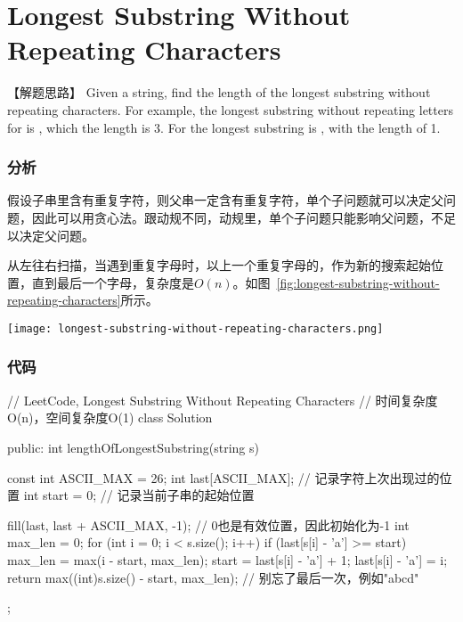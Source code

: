 \section{Longest Substring Without Repeating Characters} %
\label{sec:longest-substring-without-repeating-characters}


【解题思路】
Given a string, find the length of the longest substring without repeating characters. For example, the longest substring without repeating letters for  is 
, which the length is 3. For  the longest substring is , with the length of 1.


\subsubsection{分析}
假设子串里含有重复字符，则父串一定含有重复字符，单个子问题就可以决定父问题，因此可以用贪心法。跟动规不同，动规里，单个子问题只能影响父问题，不足以决定父问题。

从左往右扫描，当遇到重复字母时，以上一个重复字母的，作为新的搜索起始位置，直到最后一个字母，复杂度是$O(n)$。如图~\ref{fig:longest-substring-without-repeating-characters}所示。

\begin{center}
	\texttt{[image: longest-substring-without-repeating-characters.png]}\\
	\label{fig:longest-substring-without-repeating-characters}
\end{center}


\subsubsection{代码}
\begin{Code}
	// LeetCode, Longest Substring Without Repeating Characters
	// 时间复杂度O(n)，空间复杂度O(1)
	class Solution {
		public:
		int lengthOfLongestSubstring(string s) {
			const int ASCII_MAX = 26;
			int last[ASCII_MAX]; // 记录字符上次出现过的位置
			int start = 0; // 记录当前子串的起始位置
			
			fill(last, last + ASCII_MAX, -1); // 0也是有效位置，因此初始化为-1
			int max_len = 0;
			for (int i = 0; i < s.size(); i++) {
				if (last[s[i] - 'a'] >= start) {
					max_len = max(i - start, max_len);
					start = last[s[i] - 'a'] + 1;
				}
				last[s[i] - 'a'] = i;
			}
			return max((int)s.size() - start, max_len);  // 别忘了最后一次，例如"abcd"
		}
	};
\end{Code}


